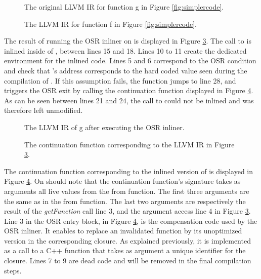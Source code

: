 \begin{figure}[h!]
\centering
{}
\caption{The original LLVM IR for function g in Figure \ref{fig:simplercode}.}
\label{fig:originalouter}
\end{figure}

\begin{figure}[h!]
\centering
{}
\caption{The LLVM IR for function f in Figure \ref{fig:simplercode}.}
\label{fig:originalinner}
\end{figure}

The result of running the OSR inliner on  is displayed in Figure \ref{fig:inlinedouter}.
The call to  is inlined inside of , between lines 15 and 18. 
Lines 10 to 11 create the dedicated environment for the inlined code.
Lines 5 and 6 correspond to the OSR condition and check that 's address corresponds to the hard coded value seen during the compilation of . 
If this assumption fails, the function jumps to line 28, and triggers the OSR exit by calling the continuation function displayed in Figure \ref{fig:continuationllvm}.
As can be seen between lines 21 and 24, the call to  could not be inlined and was therefore left unmodified.\\

\begin{figure}[h!]
\centering
{}
\caption{The LLVM IR of g after executing the OSR inliner.}
\label{fig:inlinedouter}
\end{figure}

\begin{figure}[h!]
\centering
{}
\caption{The continuation function corresponding to the LLVM IR in Figure \ref{fig:inlinedouter}.}
\label{fig:continuationllvm}
\end{figure}

The continuation function corresponding to the inlined version of  is displayed in Figure \ref{fig:continuationllvm}.
On should note that the continuation function's signature takes as arguments all live values from the from function.
The first three arguments are the same as in the from function.
The last two arguments are respectively the result of the \textit{getFunction} call line 3, and the argument access line 4 in Figure \ref{fig:inlinedouter}. 
Line 3 in the OSR entry block, in Figure \ref{fig:continuationllvm}, is the compensation code used by the OSR inliner.
It enables to replace an invalidated function by its unoptimized version in the corresponding closure. 
As explained previously, it is implemented as a call to a C++ function that takes as argument a unique identifier for the closure.
Lines 7 to 9 are dead code and will be removed in the final compilation steps.\\

